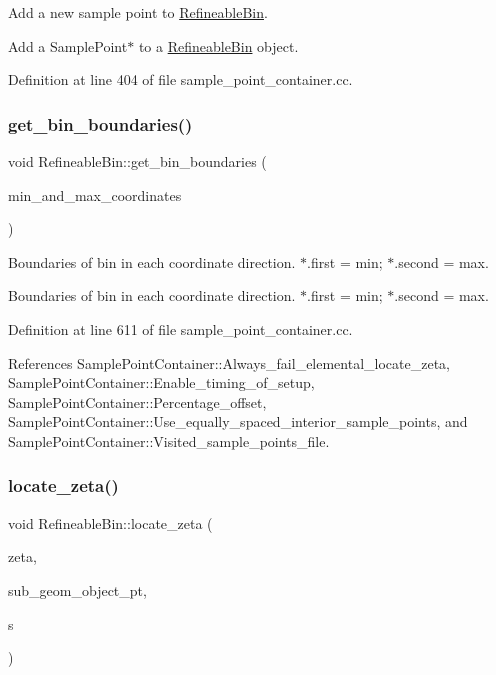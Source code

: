 Add a new sample point to \hyperlink{classRefineableBin}{Refineable\+Bin}. 

Add a Sample\+Point$\ast$ to a \hyperlink{classRefineableBin}{Refineable\+Bin} object. 

Definition at line 404 of file sample\+\_\+point\+\_\+container.\+cc.

\mbox{\label{classRefineableBin_a495380328c638a224ca8c13b1b38d952}} 
\subsubsection{\texorpdfstring{get\+\_\+bin\+\_\+boundaries()}{get\_bin\_boundaries()}}
{\footnotesize\ttfamily void Refineable\+Bin\+::get\+\_\+bin\+\_\+boundaries (\begin{DoxyParamCaption}\item[{Vector$<$ std\+::pair$<$ double, double $>$ $>$ \&}]{min\+\_\+and\+\_\+max\+\_\+coordinates }\end{DoxyParamCaption})\hspace{0.3cm}{\ttfamily [protected]}}



Boundaries of bin in each coordinate direction. $\ast$.first = min; $\ast$.second = max. 

Boundaries of bin in each coordinate direction. $\ast$.first = min; $\ast$.second = max. 

Definition at line 611 of file sample\+\_\+point\+\_\+container.\+cc.



References Sample\+Point\+Container\+::\+Always\+\_\+fail\+\_\+elemental\+\_\+locate\+\_\+zeta, Sample\+Point\+Container\+::\+Enable\+\_\+timing\+\_\+of\+\_\+setup, Sample\+Point\+Container\+::\+Percentage\+\_\+offset, Sample\+Point\+Container\+::\+Use\+\_\+equally\+\_\+spaced\+\_\+interior\+\_\+sample\+\_\+points, and Sample\+Point\+Container\+::\+Visited\+\_\+sample\+\_\+points\+\_\+file.

\mbox{\label{classRefineableBin_a92d871f784877d48ae46d363419b5e52}} 
\subsubsection{\texorpdfstring{locate\+\_\+zeta()}{locate\_zeta()}}
{\footnotesize\ttfamily void Refineable\+Bin\+::locate\+\_\+zeta (\begin{DoxyParamCaption}\item[{const Vector$<$ double $>$ \&}]{zeta,  }\item[{Geom\+Object $\ast$\&}]{sub\+\_\+geom\+\_\+object\+\_\+pt,  }\item[{Vector$<$ double $>$ \&}]{s }\end{DoxyParamCaption})}



